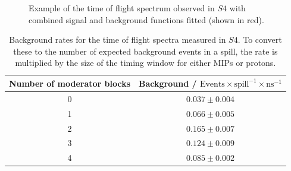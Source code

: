\begin{figure}[ht]
  \begin{adjustbox}{max totalsize={\textwidth}{.62\textheight},center}
    
  \end{adjustbox}
  \caption{Example of the time of flight spectrum observed in $\mathit{S4}$ with combined signal and background functions fitted (shown in red).}
  \label{fig:fitEx}
\end{figure}

\begin{table}
  \centering
  \caption{Background rates for the time of flight spectra measured in $\mathit{S4}$. To convert these to the number of expected background events in a spill, the rate is multiplied by the size of the timing window for either MIPs or protons.}
  \begin{tabular}{c|c}
    \hline
    \hline
    Number of moderator blocks & Background / $\text{Events} \times \text{spill}^{-1} \times \text{ns}^{-1}$ \\
    \hline
    0 & $0.037 \pm 0.004$ \\
    1 & $0.066 \pm 0.005$ \\
    2 & $0.165 \pm 0.007$ \\
    3 & $0.124 \pm 0.009$ \\
    4 & $0.085 \pm 0.002$ \\
    \hline
  \end{tabular}
  \label{tab:backgrounds}
\end{table}


